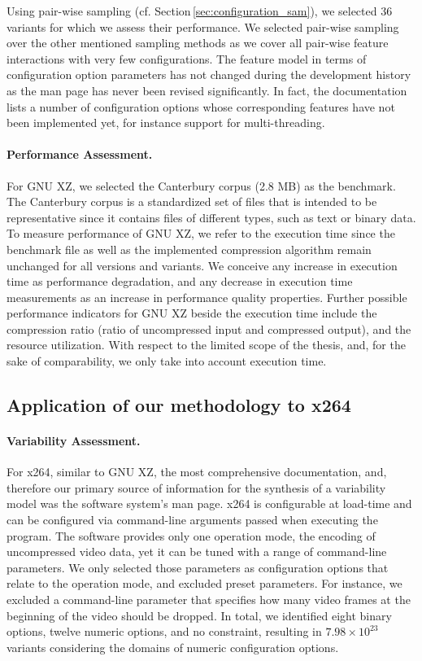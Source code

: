 Using pair-wise sampling (cf. Section\,\ref{sec:configuration_sam}), we selected
36 variants for which we assess their performance. We selected pair-wise sampling over the other
mentioned sampling methods as we cover all pair-wise feature interactions with
very few configurations. The feature model in terms of configuration option
parameters has not changed during the development history as the man page has
never been revised significantly. In fact, the documentation lists a number of
configuration options whose corresponding features have not been implemented
yet, for instance support for multi-threading.

\paragraph{Performance Assessment.} For GNU XZ, we selected the Canterbury
corpus (2.8 MB) as the benchmark. The Canterbury corpus is a standardized set of files that is
intended to be representative since it contains files of different types, such
as text or binary data. To measure performance of GNU XZ, we refer to the
execution time since the benchmark file as well as the implemented compression
algorithm remain unchanged for all versions and variants. We conceive any
increase in execution time as performance degradation, and any decrease in
execution time measurements as an increase in performance quality properties.
Further possible performance indicators for GNU XZ beside the execution time
include the compression ratio (ratio of uncompressed input and compressed
output), and the resource utilization. With respect to the limited scope of the
thesis, and, for the sake of comparability, we only take into account execution
time.

\subsection{Application of our methodology to x264}
\paragraph{Variability Assessment.} For x264, similar to GNU XZ, the most
comprehensive documentation, and, therefore our primary source of information for the
synthesis of a variability model was the software system’s man page. x264 is
configurable at load-time and can be configured via command-line arguments
passed when executing the program. The software provides only one operation
mode, the encoding of uncompressed video data, yet it can be tuned with a range
of command-line parameters. We only selected those parameters as configuration
options that relate to the operation mode, and excluded preset parameters. For
instance, we excluded a command-line parameter that specifies how many video
frames at the beginning of the video should be dropped. In total, we identified
eight binary options, twelve numeric options, and no constraint, resulting in
$7.98 \times 10^{23}$ variants considering the domains of numeric configuration
options.

